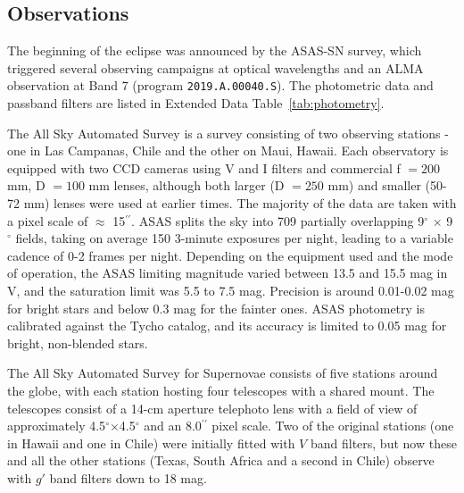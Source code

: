 \documentclass[sn-nature]{sn-jnl}%
\newcommand*\degr{\ensuremath{^\circ}}
\newcommand*\arcsec{\ensuremath{^{\prime\prime}}}
\begin{document}
\subsection*{Observations}\label{sec:obs}

The beginning of the eclipse was announced \cite{RizzoSmith21} by the ASAS-SN survey, which triggered several observing campaigns at optical wavelengths and an ALMA observation at Band 7 (program \texttt{2019.A.00040.S}).
%
The photometric data and passband filters are listed in Extended Data Table~\ref{tab:photometry}.



%
%
The All Sky Automated Survey \cite[ASAS; ][]{pojmanski_all_1997, asas_2005, asas_2018} is a survey consisting of two observing stations - one in Las Campanas, Chile and the other on Maui, Hawaii. 
%
Each observatory is equipped with two CCD cameras using V and I filters and commercial f $ = 200$ mm, D $= 100$ mm lenses, although both larger (D $=250$ mm) and smaller (50-72 mm) lenses were used at earlier times.
%
The majority of the data are taken with a pixel scale of $\approx$ 15\arcsec{}.
%
ASAS splits the sky into 709 partially overlapping 9\degr{} $\times$ 9\degr{} fields, taking on average 150 3-minute exposures per night, leading to a variable cadence of 0-2 frames per night.
%
Depending on the equipment used and the mode of operation, the ASAS limiting magnitude varied between 13.5 and 15.5 mag in V, and the saturation limit was 5.5 to 7.5 mag. 
%
Precision is around 0.01-0.02 mag for bright stars and below 0.3 mag for the fainter ones. 
%
ASAS photometry is calibrated against the Tycho catalog, and its accuracy is limited to 0.05 mag for bright, non-blended stars.


The All Sky Automated Survey for Supernovae \cite[ASAS-SN; ][]{shappee_man_2014,kochanek_all-sky_2017} consists of five stations around the globe, with each station hosting four telescopes with a shared mount.
%
The telescopes consist of a 14-cm aperture telephoto lens with a field of view of approximately 4.5\degr{}$\times$4.5\degr{} and an 8.0\arcsec{} pixel scale.
% 
Two of the original stations (one in Hawaii and one in Chile) were initially fitted with $V$ band filters, but now these and all the other stations (Texas, South Africa and a second in Chile) observe with $g'$ band filters down to 18 mag.
\end{document}
